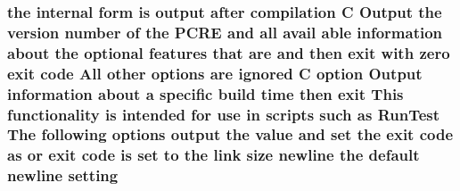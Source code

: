 \subsubsection[{\texorpdfstring{setting}{setting}}]{\setlength{\rightskip}{0pt plus 5cm}the internal form {\bf is} {\bf output} {\bf after} {\bf compilation} {\bf C} Output the version {\bf number} {\bf of} the {\bf P\+C\+RE} and {\bf all} avail {\bf able} information about the {\bf optional} {\bf features} that {\bf are} and then {\bf exit} {\bf with} {\bf zero} {\bf exit} {\bf code} All other {\bf options} {\bf are} {\bf ignored} {\bf C} {\bf option} Output information about {\bf a} specific build {\bf time} then {\bf exit} This functionality {\bf is} intended for use {\bf in} {\bf scripts} such {\bf as} Run\+Test The following {\bf options} {\bf output} the {\bf value} and {\bf set} the {\bf exit} {\bf code} {\bf as} {\bf or} {\bf exit} {\bf code} {\bf is} {\bf set} {\bf to} the link {\bf size} {\bf newline} the {\bf default} {\bf newline} setting}\hypertarget{pcretest_8txt_a935b0b98e07f1e5b6c06e9821ff32fec}{}\label{pcretest_8txt_a935b0b98e07f1e5b6c06e9821ff32fec}
